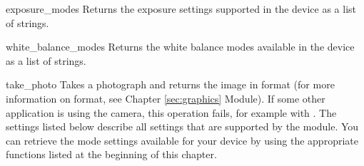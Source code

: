 \begin{funcdesc}{exposure_modes}{}
Returns the exposure settings supported in the device as a list of strings. 
\end{funcdesc}

\begin{funcdesc}{white_balance_modes}{}
Returns the white balance modes available in the device as a list of 
strings. 
\end{funcdesc}

\begin{funcdesc}{take_photo}{}
Takes a photograph and returns the image in  format (for more 
information on  format, see Chapter \ref{sec:graphics} 
 Module). If some other application is using the camera, 
this operation fails, for example with . The 
settings listed below describe all settings that are supported by the 
 module. You can retrieve the mode settings available for your 
device by using the appropriate functions listed at the beginning of this 
chapter.


\end{funcdesc}
